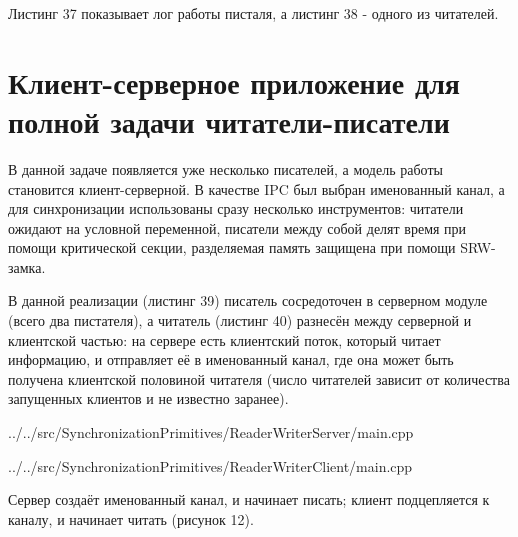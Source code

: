 \documentclass[a4paper, 12pt]{article}		%
\begin{document}
Листинг 37 показывает лог работы писталя, а листинг 38 - одного из читателей.





\newpage
\section{Клиент-серверное приложение для полной задачи читатели-писатели}

В данной задаче появляется уже несколько писателей, а модель работы становится клиент-серверной. В качестве IPC был выбран именованный канал, а для синхронизации использованы сразу несколько инструментов: читатели ожидают на условной переменной, писатели между собой делят время при помощи критической секции, разделяемая память защищена при помощи SRW-замка.

В данной реализации (листинг 39) писатель сосредоточен в серверном модуле (всего два пистателя), а читатель (листинг 40) разнесён между серверной и клиентской частью: на сервере есть клиентский поток, который читает информацию, и отправляет её в именованный канал, где она может быть получена клиентской половиной читателя (число читателей зависит от количества запущенных клиентов и не известно заранее).


{../../src/SynchronizationPrimitives/ReaderWriterServer/main.cpp}



{../../src/SynchronizationPrimitives/ReaderWriterClient/main.cpp}

Сервер создаёт именованный канал, и начинает писать; клиент подцепляется к каналу, и начинает читать (рисунок 12).
\end{document}
